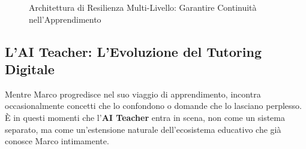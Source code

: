\documentclass[12pt,a4paper]{article}
\begin{document}
\begin{figure}[H]
\caption{Architettura di Resilienza Multi-Livello: Garantire Continuità nell'Apprendimento}
\label{fig:resilience-architecture}
\end{figure}

\subsection{L'AI Teacher: L'Evoluzione del Tutoring Digitale}
\label{subsec:ai-teacher}

Mentre Marco progredisce nel suo viaggio di apprendimento, incontra occasionalmente concetti che lo confondono o domande che lo lasciano perplesso. È in questi momenti che l'\textbf{AI Teacher} entra in scena, non come un sistema separato, ma come un'estensione naturale dell'ecosistema educativo che già conosce Marco intimamente.
\end{document}
